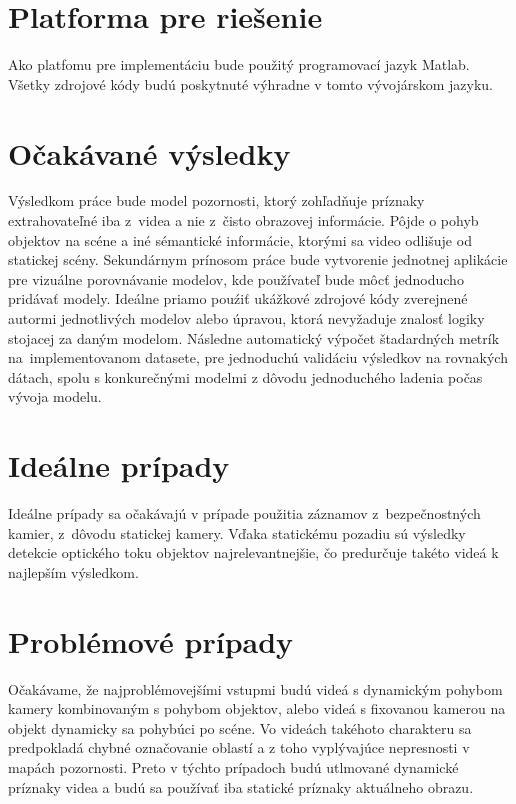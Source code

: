 \section{Platforma pre riešenie}
Ako platfomu pre implementáciu bude použitý programovací jazyk Matlab\textregistered.
Všetky zdrojové kódy budú poskytnuté výhradne v tomto vývojárskom jazyku.
\section{Očakávané výsledky}
Výsledkom práce bude model pozornosti, ktorý zohľadňuje príznaky extrahovateľné iba z~videa a nie z~čisto obrazovej informácie.
Pôjde o pohyb objektov na scéne a iné sémantické informácie, ktorými sa video odlišuje od statickej scény.
Sekundárnym prínosom práce bude vytvorenie jednotnej aplikácie pre vizuálne porovnávanie modelov, kde používateľ bude môcť jednoducho pridávať modely. Ideálne priamo pouźiť ukážkové zdrojové kódy zverejnené autormi jednotlivých modelov alebo úpravou, ktorá nevyžaduje znalosť logiky stojacej za daným modelom.
Následne automatický výpočet štadardných metrík na~implementovanom datasete, pre jednoduchú validáciu výsledkov na rovnakých dátach, spolu s konkurečnými modelmi z dôvodu jednoduchého ladenia počas vývoja modelu.
\section{Ideálne prípady}
Ideálne prípady sa očakávajú v prípade použitia záznamov z~bezpečnostných kamier, z~dôvodu statickej kamery.
Vďaka statickému pozadiu sú výsledky detekcie optického toku objektov najrelevantnejšie, čo predurčuje takéto videá k najlepším výsledkom.
\section{Problémové prípady}
Očakávame, že najproblémovejšími vstupmi budú videá s dynamickým pohybom kamery kombinovaným s pohybom objektov, alebo videá s fixovanou kamerou na objekt dynamicky sa pohybúci po scéne.
Vo videách takéhoto charakteru sa predpokladá chybné označovanie oblastí a z toho vyplývajúce nepresnosti v mapách pozornosti.
Preto v týchto prípadoch budú utlmované dynamické príznaky videa a budú sa používať iba statické príznaky aktuálneho obrazu.
